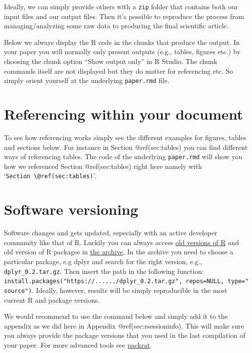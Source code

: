 \documentclass[
  12pt,
]{article}
\begin{document}
Ideally, we can simply provide others with a \texttt{zip} folder that
contains both our input files and our output files. Then it's possible
to reproduce the process from managing/analyzing some raw data to
producing the final scientific article.

Below we always display the R code in the chunks that produce the
output. In your paper you will normally only present outputs (e.g.,
tables, figures etc.) by choosing the chunk option ``Show output only''
in R Studio. The chunk commands itself are not displayed but they do
matter for referencing etc. So simply orient yourself at the underlying
\texttt{paper.rmd} file.

\hypertarget{referencing-within-your-document}{%
\section{Referencing within your
document}\label{referencing-within-your-document}}

To see how referencing works simply see the different examples for
figures, tables and sections below. For instance in Section
@ref(sec:tables) you can find different ways of referencing tables. The
code of the underlying \texttt{paper.rmd} will show you how we
referenced Section @ref(sec:tables) right here namely with
`\texttt{Section\ \textbackslash{}@ref(sec:tables)}'.

\hypertarget{software-versioning}{%
\section{Software versioning}\label{software-versioning}}

Software changes and gets updated, especially with an active developer
community like that of R. Luckily you can always access
\href{https://cran.r-project.org/bin/windows/base/old/}{old versions of
R} and old version of R packages in
\href{https://cran.r-project.org/src/contrib/Archive/}{the archive}. In
the archive you need to choose a particular package, e.g dplyr and
search for the right version, e.g., \texttt{dplyr\_0.2.tar.gz}. Then
insert the path in the following function:
\texttt{install.packages("https://....../dplyr\_0.2.tar.gz",\ repos=NULL,\ type="source")}.
Ideally, however, results will be simply reproducible in the most
current R and package versions.

We would recommend to use the command below and simply add it to the
appendix as we did here in Appendix @ref(sec:rsessioninfo). This will
make sure you always provide the package versions that you used in the
last compilation of your paper. For more advanced tools see
\href{https://rstudio.github.io/packrat/}{packrat}.
\end{document}

